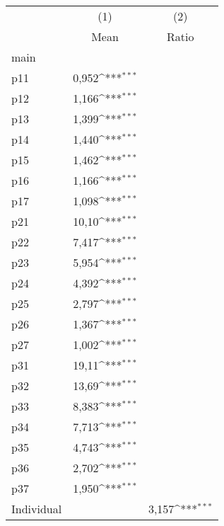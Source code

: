{
\def\sym#1{\ifmmode^{#1}\else\(^{#1}\)\fi}
\begin{tabular}{l*{2}{c}}
\hline\hline
            &\multicolumn{1}{c}{(1)}&\multicolumn{1}{c}{(2)}\\
            &\multicolumn{1}{c}{Mean}&\multicolumn{1}{c}{Ratio}\\
\hline
main        &                     &                     \\
p11         &       0,952\sym{***}&                     \\
p12         &       1,166\sym{***}&                     \\
p13         &       1,399\sym{***}&                     \\
p14         &       1,440\sym{***}&                     \\
p15         &       1,462\sym{***}&                     \\
p16         &       1,166\sym{***}&                     \\
p17         &       1,098\sym{***}&                     \\
p21         &       10,10\sym{***}&                     \\
p22         &       7,417\sym{***}&                     \\
p23         &       5,954\sym{***}&                     \\
p24         &       4,392\sym{***}&                     \\
p25         &       2,797\sym{***}&                     \\
p26         &       1,367\sym{***}&                     \\
p27         &       1,002\sym{***}&                     \\
p31         &       19,11\sym{***}&                     \\
p32         &       13,69\sym{***}&                     \\
p33         &       8,383\sym{***}&                     \\
p34         &       7,713\sym{***}&                     \\
p35         &       4,743\sym{***}&                     \\
p36         &       2,702\sym{***}&                     \\
p37         &       1,950\sym{***}&                     \\
Individual  &                     &       3,157\sym{***}\\

\end{tabular}}
